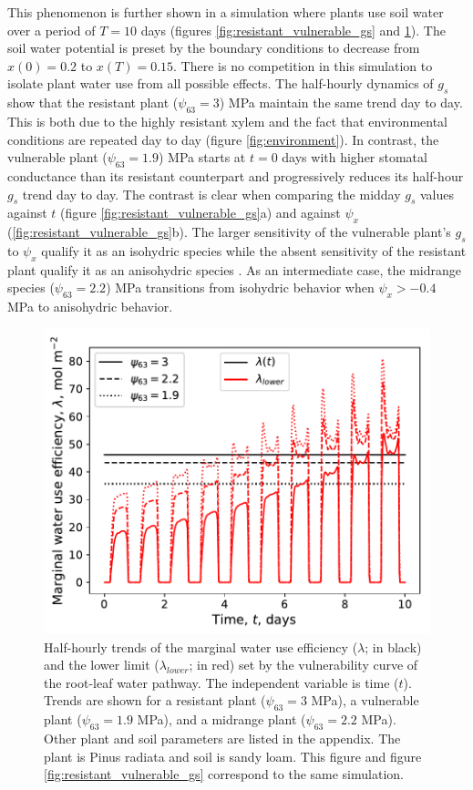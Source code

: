 \documentclass[utf8]{frontiersSCNS} %
\begin{document}
This phenomenon is further shown in a simulation where plants use soil water over a period of $T=10$ days (figures \ref{fig:resistant_vulnerable_gs} and \ref{fig:resistant_vulnerable_lambda}). The soil water potential is preset by the boundary conditions to decrease from $x(0)=0.2$ to $x(T)=0.15$. There is no competition in this simulation to isolate plant water use from all possible effects. The half-hourly dynamics of $g_s$ show that the resistant plant ($\psi_{63}=3$) MPa maintain the same trend day to day. This is both due to the highly resistant xylem and the fact that environmental conditions are repeated day to day (figure \ref{fig:environment}). In contrast, the vulnerable plant ($\psi_{63}=1.9$) MPa starts at $t=0$ days with higher stomatal conductance than its resistant counterpart and progressively reduces its half-hour $g_s$ trend day to day. The contrast is clear when comparing the midday $g_s$ values against $t$ (figure \ref{fig:resistant_vulnerable_gs}a) and against $\psi_x$ (\ref{fig:resistant_vulnerable_gs}b). The larger sensitivity of the vulnerable plant's $g_s$ to $\psi_x$ qualify it as an isohydric species while the absent sensitivity of the resistant plant qualify it as an anisohydric species \citep{Hochberg2017}. As an intermediate case, the midrange species ($\psi_{63}=2.2$) MPa transitions from isohydric behavior when $\psi_x>-0.4$ MPa to anisohydric behavior.

\begin{figure}
    \begin{center}
         \includegraphics[scale=0.75]{Fig4.pdf}   
    \end{center}
    \caption{Half-hourly trends of the marginal water use efficiency ($\lambda$; in black) and the lower limit ($\lambda_{lower}$; in red) set by the vulnerability curve of the root-leaf water pathway. The independent variable is time ($t$). Trends are shown for a resistant plant ($\psi_{63} = 3$ MPa), a vulnerable plant ($\psi_{63} = 1.9$ MPa), and a midrange plant ($\psi_{63} = 2.2$ MPa). Other plant and soil parameters are listed in the appendix. The plant is Pinus radiata and soil is sandy loam. This figure and figure \ref{fig:resistant_vulnerable_gs} correspond to the same simulation.}
    \label{fig:resistant_vulnerable_lambda}
\end{figure}
\end{document}
